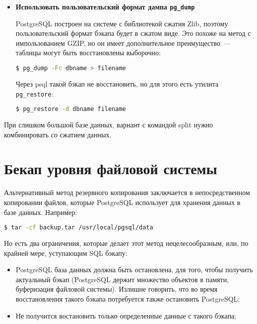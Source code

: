 \begin{itemize}
  \item \textbf{Использовать пользовательский формат дампа \lstinline!pg_dump!}

PostgreSQL построен на системе с библиотекой сжатия Zlib, поэтому пользовательский формат бэкапа будет в сжатом виде. Это похоже на метод с импользованием GZIP, но он имеет дополнительное преимущество~--- таблицы могут быть восстановлены выборочно:

\begin{lstlisting}[language=Bash,label=lst:backups12,caption=Создание бэкапа PostgreSQL]
$ pg_dump -Fc dbname > filename
\end{lstlisting}

Через psql такой бэкап не восстановить, но для этого есть утилита \lstinline!pg_restore!:

\begin{lstlisting}[language=Bash,label=lst:backups13,caption=Восстановление бэкапа PostgreSQL]
$ pg_restore -d dbname filename
\end{lstlisting}

\end{itemize}

При слишком большой базе данных, вариант с командой split нужно комбинировать со сжатием данных.


\section{Бекап уровня файловой системы}

Альтернативный метод резервного копирования заключается в непосредственном копировании файлов, которые PostgreSQL использует для хранения данных в базе данных. Например:

\begin{lstlisting}[language=Bash,label=lst:backups14,caption=Бэкап PostgreSQL файлов]
$ tar -cf backup.tar /usr/local/pgsql/data
\end{lstlisting}

Но есть два ограничения, которые делает этот метод нецелесообразным, или, по крайней мере, уступающим SQL бэкапу:

\begin{itemize}
  \item PostgreSQL база данных должна быть остановлена, для того, чтобы получить актуальный бэкап (PostgreSQL держит множество объектов в памяти, буферизация файловой системы). Излишне говорить, что во время восстановления такого бэкапа потребуется также остановить PostgreSQL;
  \item Не получится востановить только определенные данные с такого бэкапа;
\end{itemize}

